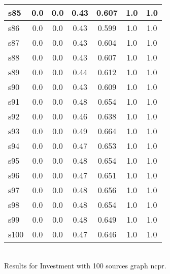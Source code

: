 \documentclass{article}
\begin{document}
\begin{tabular}{|l|c|c|c|c|c|c|}
\hline
s85 &0.0 & 0.0 & 0.43 & 0.607 & 1.0 & 1.0\\
\hline
s86 &0.0 & 0.0 & 0.43 & 0.599 & 1.0 & 1.0\\
\hline
s87 &0.0 & 0.0 & 0.43 & 0.604 & 1.0 & 1.0\\
\hline
s88 &0.0 & 0.0 & 0.43 & 0.607 & 1.0 & 1.0\\
\hline
s89 &0.0 & 0.0 & 0.44 & 0.612 & 1.0 & 1.0\\
\hline
s90 &0.0 & 0.0 & 0.43 & 0.609 & 1.0 & 1.0\\
\hline
s91 &0.0 & 0.0 & 0.48 & 0.654 & 1.0 & 1.0\\
\hline
s92 &0.0 & 0.0 & 0.46 & 0.638 & 1.0 & 1.0\\
\hline
s93 &0.0 & 0.0 & 0.49 & 0.664 & 1.0 & 1.0\\
\hline
s94 &0.0 & 0.0 & 0.47 & 0.653 & 1.0 & 1.0\\
\hline
s95 &0.0 & 0.0 & 0.48 & 0.654 & 1.0 & 1.0\\
\hline
s96 &0.0 & 0.0 & 0.47 & 0.651 & 1.0 & 1.0\\
\hline
s97 &0.0 & 0.0 & 0.48 & 0.656 & 1.0 & 1.0\\
\hline
s98 &0.0 & 0.0 & 0.48 & 0.654 & 1.0 & 1.0\\
\hline
s99 &0.0 & 0.0 & 0.48 & 0.649 & 1.0 & 1.0\\
\hline
s100 &0.0 & 0.0 & 0.47 & 0.646 & 1.0 & 1.0\\
\hline
\end{tabular}\\

\noindent Results for Investment with 100 sources graph ncpr.
\end{document}
